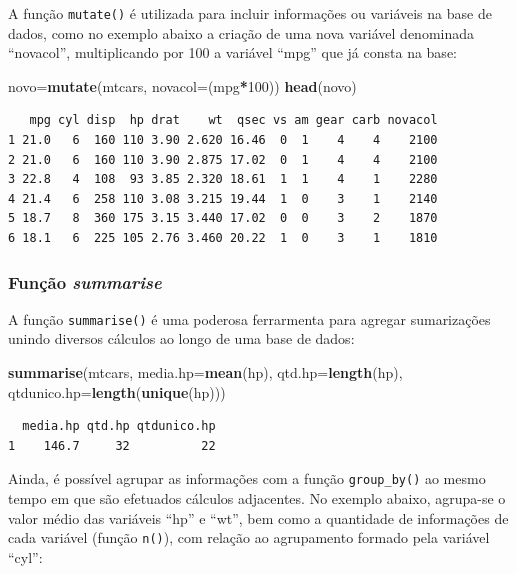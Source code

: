 \documentclass[12pt,brazil,oneside]{book}
\newenvironment{Shaded}{\begin{snugshade}}{\end{snugshade}}
\newcommand{\DataTypeTok}[1]{\textcolor[rgb]{0.13,0.29,0.53}{#1}}
\newcommand{\DecValTok}[1]{\textcolor[rgb]{0.00,0.00,0.81}{#1}}
\newcommand{\KeywordTok}[1]{\textcolor[rgb]{0.13,0.29,0.53}{\textbf{#1}}}
\newcommand{\NormalTok}[1]{#1}
\newcommand{\OperatorTok}[1]{\textcolor[rgb]{0.81,0.36,0.00}{\textbf{#1}}}
\begin{document}
A função \texttt{mutate()} é utilizada para incluir informações ou variáveis na base de dados, como no exemplo abaixo a criação de uma nova variável denominada ``novacol'', multiplicando por 100 a variável ``mpg'' que já consta na base:

\begin{Shaded}
\begin{Highlighting}[]
\NormalTok{novo=}\KeywordTok{mutate}\NormalTok{(mtcars, }\DataTypeTok{novacol=}\NormalTok{(mpg}\OperatorTok{*}\DecValTok{100}\NormalTok{))}
\KeywordTok{head}\NormalTok{(novo)}
\end{Highlighting}
\end{Shaded}

\begin{verbatim}
   mpg cyl disp  hp drat    wt  qsec vs am gear carb novacol
1 21.0   6  160 110 3.90 2.620 16.46  0  1    4    4    2100
2 21.0   6  160 110 3.90 2.875 17.02  0  1    4    4    2100
3 22.8   4  108  93 3.85 2.320 18.61  1  1    4    1    2280
4 21.4   6  258 110 3.08 3.215 19.44  1  0    3    1    2140
5 18.7   8  360 175 3.15 3.440 17.02  0  0    3    2    1870
6 18.1   6  225 105 2.76 3.460 20.22  1  0    3    1    1810
\end{verbatim}

\hypertarget{funcao-summarise}{%
\subsubsection{\texorpdfstring{Função \emph{summarise}}{Função summarise}}\label{funcao-summarise}}

A função \texttt{summarise()} é uma poderosa ferrarmenta para agregar sumarizações unindo diversos cálculos ao longo de uma base de dados:

\begin{Shaded}
\begin{Highlighting}[]
\KeywordTok{summarise}\NormalTok{(mtcars, }
          \DataTypeTok{media.hp=}\KeywordTok{mean}\NormalTok{(hp), }
          \DataTypeTok{qtd.hp=}\KeywordTok{length}\NormalTok{(hp),}
          \DataTypeTok{qtdunico.hp=}\KeywordTok{length}\NormalTok{(}\KeywordTok{unique}\NormalTok{(hp)))}
\end{Highlighting}
\end{Shaded}

\begin{verbatim}
  media.hp qtd.hp qtdunico.hp
1    146.7     32          22
\end{verbatim}

Ainda, é possível agrupar as informações com a função \texttt{group\_by()} ao mesmo tempo em que são efetuados cálculos adjacentes. No exemplo abaixo, agrupa-se o valor médio das variáveis ``hp'' e ``wt'', bem como a quantidade de informações de cada variável (função \texttt{n()}), com relação ao agrupamento formado pela variável ``cyl'':
\end{document}
